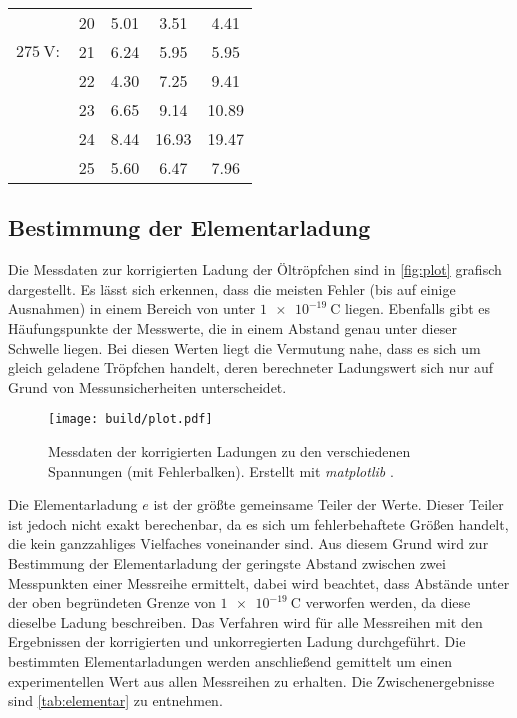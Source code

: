 \begin{table}
\begin{tabular}{c l S[table-format = 1.2] S[table-format = 2.2] S}
        {                   } & {20} & 5.01 &  3.51 &  4.41 \\
        {$\qty{275}{\volt}:$} & {21} & 6.24 &  5.95 &  5.95 \\
        {                   } & {22} & 4.30 &  7.25 &  9.41 \\
        {                   } & {23} & 6.65 &  9.14 & 10.89 \\
        {                   } & {24} & 8.44 & 16.93 & 19.47 \\
        {                   } & {25} & 5.60 &  6.47 &  7.96 \\
      \bottomrule
    \end{tabular}
  \end{table}

\subsection{Bestimmung der Elementarladung}
\label{subsec:Elementarladung}

Die Messdaten zur korrigierten Ladung der Öltröpfchen sind in \autoref{fig:plot} grafisch dargestellt. Es lässt sich erkennen, dass die meisten Fehler 
(bis auf einige Ausnahmen) in einem Bereich von unter $\qty{1e-19}{\coulomb}$ liegen. Ebenfalls gibt es Häufungspunkte der Messwerte, die in einem 
Abstand genau unter dieser Schwelle liegen. Bei diesen Werten liegt die Vermutung nahe, dass es sich um gleich geladene Tröpfchen handelt, deren
berechneter Ladungswert sich nur auf Grund von Messunsicherheiten unterscheidet.

\begin{figure}
    \centering
    \texttt{[image: build/plot.pdf]}
    \caption{Messdaten der korrigierten Ladungen zu den verschiedenen Spannungen (mit Fehlerbalken). Erstellt mit \textit{matplotlib} \cite{matplotlib}.}
    \label{fig:plot}
\end{figure}

Die Elementarladung $e$ ist der größte gemeinsame Teiler der Werte. Dieser Teiler ist jedoch nicht exakt berechenbar, da es sich um fehlerbehaftete Größen handelt, die
kein ganzzahliges Vielfaches voneinander sind. Aus diesem Grund wird zur Bestimmung der Elementarladung der geringste Abstand zwischen zwei Messpunkten 
einer Messreihe ermittelt, dabei wird beachtet, dass Abstände unter der oben begründeten Grenze von $\qty{1e-19}{\coulomb}$ verworfen werden, da diese
dieselbe Ladung beschreiben.
Das Verfahren wird für alle Messreihen mit den Ergebnissen der korrigierten und unkorregierten Ladung durchgeführt. Die bestimmten Elementarladungen werden anschließend
gemittelt um einen experimentellen Wert aus allen Messreihen zu erhalten. Die Zwischenergebnisse sind \autoref{tab:elementar} zu entnehmen.

